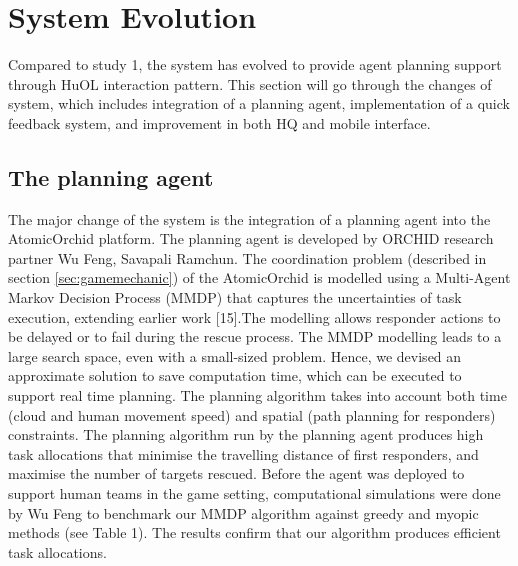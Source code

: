 

\section{System Evolution}
Compared to study 1, the system has evolved to provide agent planning support through HuOL interaction pattern. This section will go through the changes of system, which includes integration of a planning agent, implementation of a quick feedback system, and improvement in both HQ and mobile interface.

\subsection{The planning agent}
The major change of the system is the integration of a planning agent into the AtomicOrchid platform. The planning agent is developed by ORCHID research partner Wu Feng, Savapali Ramchun. The coordination problem (described in section \ref{sec:gamemechanic}) of the AtomicOrchid is modelled using a Multi-Agent Markov Decision Process (MMDP) that captures the uncertainties of task execution, extending earlier work [15].The modelling allows responder actions to be delayed or to fail during the rescue process. The MMDP modelling leads to a large search space, even with a small-sized problem. Hence, we devised an approximate solution to save computation time, which can be executed to support real time planning. The planning algorithm takes into account both time (cloud and human movement speed) and spatial (path planning for responders) constraints. The planning algorithm run by the planning agent produces high task allocations that minimise the travelling distance of first responders, and maximise the number of targets rescued. Before the agent was deployed to support human teams in the game setting, computational simulations were done by Wu Feng to benchmark our MMDP algorithm against greedy and myopic methods (see Table 1). The results confirm that our algorithm produces efficient task allocations.\\


